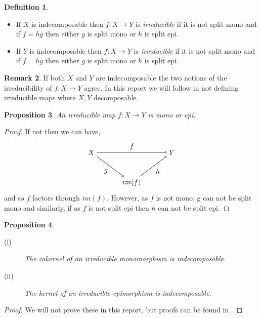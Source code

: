 \documentclass[11.5pt, twoside, a4paper, titlepage]{report}
\theoremstyle{definition}
\newtheorem{mydef}{Definition}[section]
\newtheorem{rem}[mydef]{Remark}
\theoremstyle{plain}
\newtheorem{prop}[mydef]{Proposition}
\begin{document}
\begin{mydef}
\begin{itemize}
\item If $X$ is indecomposable then $f:X \to Y$ is \emph{irreducible} if it is not split mono and if $f=hg$ then either $g$ is split mono or $h$ is split epi.
\item If $Y$ is indecomposable then $f: X \to Y$ is \emph{irreducible} if it is not split mono and if $f=hg$ then either $g$ is split mono or $h$ is split epi.
\end{itemize}
\end{mydef}

\begin{rem}
If both $X$ and $Y$ are indecomposable the two notions of the irreducibility of $f:X \to Y$ agree. In this report we will follow \cite{CB3} in not defining irreducible maps where $X,Y$ decomposable.
\end{rem}

\begin{prop}
An irreducible map $f: X \to Y$ is mono or epi.
\end{prop}
\begin{proof}
If not then we can have,
\begin{equation*}
\begin{tikzpicture}[->,-latex, auto, main path/.style={->, semithick}, main node/.style={}]
\node	[main node]		(1) at (0,0)		{$X$};
\node [main node]		(2) at (4,0)		{$Y$};
\node [main node]		(3) at (2,-1.5)	{$im(f)$};

\draw (1) [main path] edge node [auto] {$f$} (2);
\draw (1) [main path] edge node [auto, swap] {$g$} (3);
\draw (3) [main path] edge node [auto, swap] {$h$} (2);
\end{tikzpicture}
\end{equation*}
and so $f$ factors through $im(f)$. However, as $f$ is not mono, g can not be split mono and similarly, if as $f$ is not split epi then $h$ can not be split epi.
\end{proof}

\begin{prop}
\begin{description}
\item [(i)] The cokernel of an irreducible monomorphism is indecomposable.
\item [(ii)] The kernel of an irreducible epimorphism is indecomposable.
\end{description}
\end{prop}
\begin{proof}
We will not prove these in this report, but proofs can be found in \cite{Assem}.
\end{proof}
\end{document}
